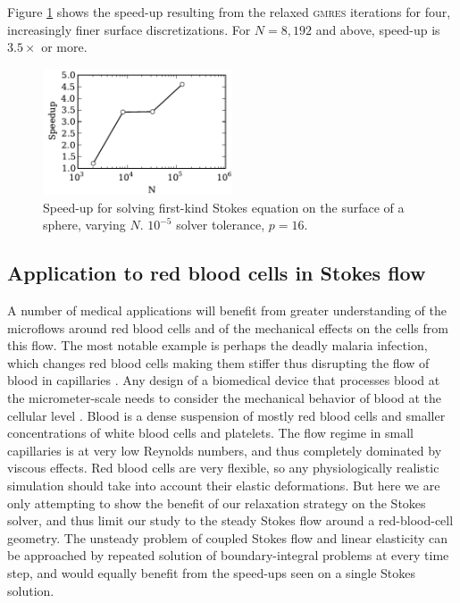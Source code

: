\documentclass[final,leqno,]{siamltex1213}
\newcommand{\gmres}{\textsc{gmres}\xspace}
\begin{document}
Figure \ref{fig:stokes_speedup} shows the speed-up resulting from the relaxed \gmres iterations for four, increasingly finer surface discretizations. For $N=8,192$ and above, speed-up is $3.5\times$ or more.


\begin{figure}%
\begin{center}
	\includegraphics[natwidth=3in,natheight=2in,width=0.5\textwidth]{StokesSpeedupRelaxation.pdf}
	\caption{Speed-up for solving first-kind Stokes equation on the surface of a sphere, varying $N$. $10^{-5}$ solver tolerance, $p=16$. }
	\label{fig:stokes_speedup}
\end{center}
\end{figure}

\subsection{Application to red blood cells in Stokes flow}

A number of medical applications will benefit from greater understanding of the microflows around red blood cells and of the mechanical effects on the cells from this flow. 
The most notable example is perhaps the deadly malaria infection, which changes red blood cells making them stiffer thus disrupting the flow of blood in capillaries \cite{FedosovETal2011}.
Any design of a biomedical device that processes blood at the micrometer-scale needs to consider the mechanical behavior of blood at the cellular level \cite{Freund2014}. Blood is a dense suspension of mostly red blood cells and smaller concentrations of white blood cells and platelets. The flow regime in small capillaries is at very low Reynolds numbers, and thus completely dominated by viscous effects. 
Red blood cells are very flexible, so any physiologically realistic simulation should take into account their elastic deformations. But here we are only attempting to show the benefit of our relaxation strategy on the Stokes solver, and thus limit our study to the steady Stokes flow around a red-blood-cell geometry. The unsteady problem of coupled Stokes flow and linear elasticity can be approached by repeated solution of boundary-integral problems at every time step, and would equally benefit from the speed-ups seen on a single Stokes solution.
\end{document}
